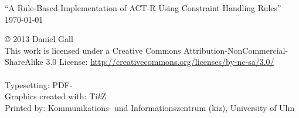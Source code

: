 \documentclass[
    a4paper,
    10pt,
    bibliography=totoc,
    twoside,
    openright,
    numbers=noenddot,
    headings=normal,
    DIV=9,
    BCOR=7mm
    ,parskip
]{scrbook}
\newcommand{\fullname}{Daniel Gall}
\newcommand{\titel}{A Rule-Based Implementation of ACT-R Using Constraint Handling Rules}
\newcommand{\jahr}{2013}
\newcommand{\arbeit}{Master Thesis}
\newcommand{\FIXME}[1]{} %
\begin{document}
\clearpage
\thispagestyle{empty}
{
    \small \flushleft \enquote{\titel}\\
    \today
    \vfill



    \copyright{} \jahr{} \fullname{}\\[0.5em]
    This work is licensed under a Creative Commons Attribution-NonCommercial-ShareAlike 3.0 License: \url{http://creativecommons.org/licenses/by-nc-sa/3.0/}\\
    \ccbyncsa\\
    \vspace{0.5cm}
    Typesetting: PDF-\LaTeXe{}\\
    Graphics created with: Ti\textit{k}Z\\
    Printed by: Kommunikations- und Informationszentrum (kiz), University of Ulm
}
\end{document}
